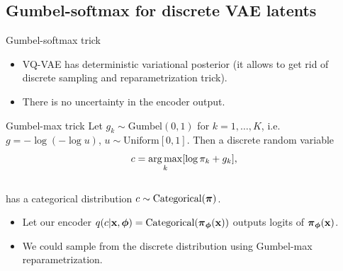 \subsection{Gumbel-softmax for discrete VAE latents}
\begin{frame}{Gumbel-softmax trick}
	\begin{itemize}
		\item VQ-VAE has deterministic variational posterior (it allows to get rid of discrete sampling and reparametrization trick).
		\item There is no uncertainty in the encoder output. 
	\end{itemize}
	\vspace{-0.2cm}
	\begin{block}{Gumbel-max trick}
		Let $g_k \sim \text{Gumbel}(0, 1)$ for $k = 1, \dots, K$, i.e. $g = - \log (- \log u)$, $u \sim \text{Uniform}[0, 1]$. Then a discrete random variable
		\vspace{-0.2cm}
		\[
			c = \operatorname*{arg\,max}_k [\log \pi_k + g_k],
		\]
		\vspace{-0.5cm} \\
		has a categorical distribution $c \sim \text{Categorical}(\boldsymbol{\pi})$.
	\end{block}
	\begin{itemize}
		\item Let our encoder $q(c | \mathbf{x}, \boldsymbol{\phi}) = \text{Categorical}(\boldsymbol{\pi}_{\boldsymbol{\phi}}(\mathbf{x}))$ outputs logits of $\boldsymbol{\pi}_{\boldsymbol{\phi}}(\mathbf{x})$.
		\item We could sample from the discrete distribution using Gumbel-max reparametrization.
	\end{itemize}

\end{frame}

